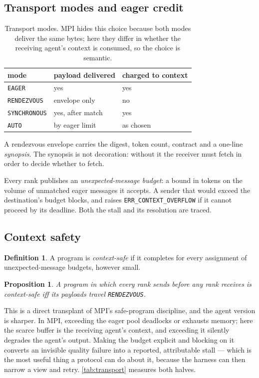 \documentclass[10pt,twocolumn]{article}
\theoremstyle{definition}
\newtheorem{definition}{Definition}
\theoremstyle{plain}
\newtheorem{proposition}{Proposition}
\newcommand{\code}[1]{\texttt{\small #1}}
\begin{document}
\subsection{Transport modes and eager credit}

\begin{table}[t]
\centering\small
\begin{tabular}{lll}
\toprule
mode & payload delivered & charged to context \\
\midrule
\code{EAGER} & yes & yes \\
\code{RENDEZVOUS} & envelope only & no \\
\code{SYNCHRONOUS} & yes, after match & yes \\
\code{AUTO} & by eager limit & as chosen \\
\bottomrule
\end{tabular}
\caption{Transport modes. MPI hides this choice because both modes deliver the
same bytes; here they differ in whether the receiving agent's context is consumed,
so the choice is semantic.}
\label{tab:modes}
\end{table}

A rendezvous envelope carries the digest, token count, contract and a one-line
\emph{synopsis}. The synopsis is not decoration: without it the receiver must
fetch in order to decide whether to fetch.

Every rank publishes an \emph{unexpected-message budget}: a bound in tokens on the
volume of unmatched eager messages it accepts. A sender that would exceed the
destination's budget blocks, and raises \code{ERR\_CONTEXT\_OVERFLOW} if it cannot
proceed by its deadline. Both the stall and its resolution are traced.

\subsection{Context safety}

\begin{definition}
A program is \emph{context-safe} if it completes for every assignment of
unexpected-message budgets, however small.
\end{definition}

\begin{proposition}
A program in which every rank sends before any rank receives is context-safe iff
its payloads travel \code{RENDEZVOUS}.
\end{proposition}

This is a direct transplant of MPI's safe-program discipline, and the agent version
is sharper. In MPI, exceeding the eager pool deadlocks or exhausts memory; here the
scarce buffer is the receiving agent's context, and exceeding it silently degrades
the agent's output. Making the budget explicit and blocking on it converts an
invisible quality failure into a reported, attributable stall --- which is the most
useful thing a protocol can do about it, because the harness can then narrow a view
and retry. \cref{tab:transport} measures both halves.
\end{document}
